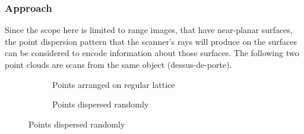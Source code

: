 \subsubsection{Approach}
Since the scope here is limited to range images, that have near-planar surfaces, the point dispersion pattern that the scanner's rays will produce on the surfaces can be considered to encode information about those surfaces. The following two point clouds are scans from the same object (dessus-de-porte).
\begin{figure}[H]
{
\centering
\setlength{\fboxsep}{0pt}%
\setlength{\fboxrule}{0.5pt}%
\hspace*{\fill}%
\begin{subfigure}{.48\textwidth}
	\caption{Points arranged on regular lattice}
\end{subfigure}%
\hfill%
\begin{subfigure}{.48\textwidth}
	\caption{Points dispersed randomly}
\end{subfigure}
}
\end{figure}

